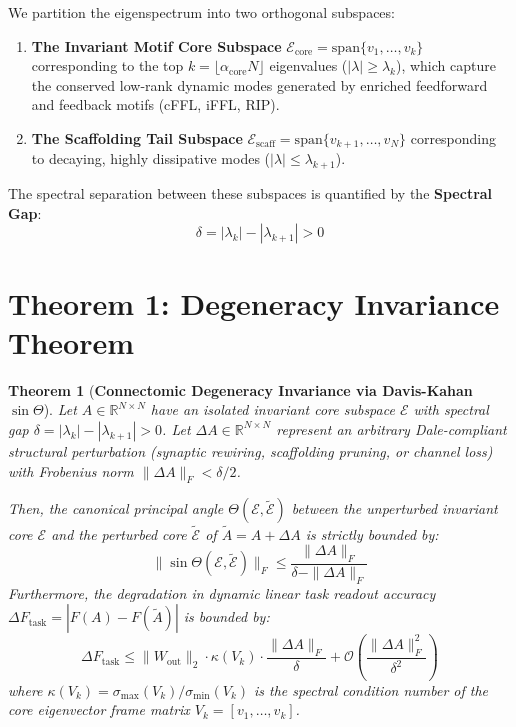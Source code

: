 \documentclass[11pt,letterpaper]{report}
\newtheorem{theorem}{Theorem}
\begin{document}
We partition the eigenspectrum into two orthogonal subspaces:
\begin{enumerate}[leftmargin=*]
    \item \textbf{The Invariant Motif Core Subspace} $\mathcal{E}_{\mathrm{core}} = \mathrm{span}\{v_1, \dots, v_k\}$ corresponding to the top $k = \lfloor \alpha_{\mathrm{core}} N \rfloor$ eigenvalues ($|\lambda| \ge \lambda_k$), which capture the conserved low-rank dynamic modes generated by enriched feedforward and feedback motifs (cFFL, iFFL, RIP).
    \item \textbf{The Scaffolding Tail Subspace} $\mathcal{E}_{\mathrm{scaff}} = \mathrm{span}\{v_{k+1}, \dots, v_N\}$ corresponding to decaying, highly dissipative modes ($|\lambda| \le \lambda_{k+1}$).
\end{enumerate}
The spectral separation between these subspaces is quantified by the \textbf{Spectral Gap}:
\begin{equation}
\delta = |\lambda_k| - |\lambda_{k+1}| > 0
\end{equation}

\section{Theorem 1: Degeneracy Invariance Theorem}
\begin{theorem}[\textbf{Connectomic Degeneracy Invariance via Davis-Kahan $\sin\Theta$}]
Let $A \in \mathbb{R}^{N \times N}$ have an isolated invariant core subspace $\mathcal{E}$ with spectral gap $\delta = |\lambda_k| - |\lambda_{k+1}| > 0$. Let $\Delta A \in \mathbb{R}^{N \times N}$ represent an arbitrary Dale-compliant structural perturbation (synaptic rewiring, scaffolding pruning, or channel loss) with Frobenius norm $\|\Delta A\|_F < \delta / 2$.

Then, the canonical principal angle $\Theta(\mathcal{E}, \tilde{\mathcal{E}})$ between the unperturbed invariant core $\mathcal{E}$ and the perturbed core $\tilde{\mathcal{E}}$ of $\tilde{A} = A + \Delta A$ is strictly bounded by:
\begin{equation}
\|\sin\Theta(\mathcal{E}, \tilde{\mathcal{E}})\|_F \le \frac{\|\Delta A\|_F}{\delta - \|\Delta A\|_F}
\end{equation}
Furthermore, the degradation in dynamic linear task readout accuracy $\Delta F_{\mathrm{task}} = |F(A) - F(\tilde{A})|$ is bounded by:
\begin{equation}
\Delta F_{\mathrm{task}} \le \|W_{\mathrm{out}}\|_2 \cdot \kappa(V_k) \cdot \frac{\|\Delta A\|_F}{\delta} + \mathcal{O}\left( \frac{\|\Delta A\|_F^2}{\delta^2} \right)
\end{equation}
where $\kappa(V_k) = \sigma_{\max}(V_k) / \sigma_{\min}(V_k)$ is the spectral condition number of the core eigenvector frame matrix $V_k = [v_1, \dots, v_k]$.
\end{theorem}
\end{document}
